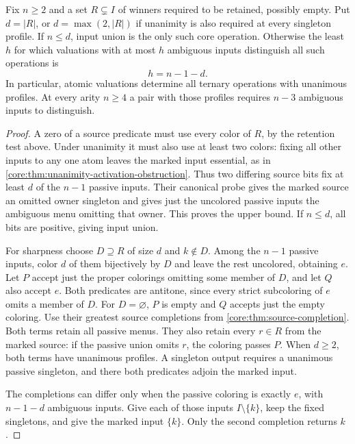 \begin{theorem}
\label{core:thm:sharp-ambiguity-probes}
Fix $n\geq2$ and a set $R\subsetneq I$ of winners required to be
retained, possibly empty. Put $d=|R|$, or $d=\max(2,|R|)$ if
unanimity is also required at every singleton profile.
If $n\leq d$, input union is the only such core operation. Otherwise
the least $h$ for which valuations with at most $h$ ambiguous inputs
distinguish all such operations is
\[
 h=n-1-d.
\]
In particular, atomic valuations determine all ternary operations
with unanimous profiles. At every arity $n\geq4$ a pair with those
profiles requires $n-3$ ambiguous inputs to distinguish.
\end{theorem}
\begin{proof}
A zero of a source predicate must use every color of $R$, by the
retention test above. Under unanimity it must also use at least two
colors: fixing all other inputs to any one atom leaves the marked
input essential, as in \cref{core:thm:unanimity-activation-obstruction}.
Thus two differing source bits fix at least $d$ of the $n-1$ passive
inputs. Their canonical probe gives the marked source an omitted
owner singleton and gives just the uncolored passive inputs the
ambiguous menu omitting that owner. This proves the upper bound.
If $n\leq d$, all bits are positive, giving input union.

For sharpness choose $D\supseteq R$ of size $d$ and $k\notin D$.
Among the $n-1$ passive inputs, color $d$ of them bijectively by $D$
and leave the rest uncolored, obtaining $e$. Let $P$ accept just the
proper colorings omitting some member of $D$, and let $Q$ also accept
$e$. Both predicates are antitone, since every strict subcoloring of
$e$ omits a member of $D$. For $D=\varnothing$, $P$ is empty and
$Q$ accepts just the empty coloring.
Use their greatest source completions from
\cref{core:thm:source-completion}. Both terms retain all passive
menus. They also retain every $r\in R$ from the marked source: if
the passive union omits $r$, the coloring passes $P$. When $d\geq2$,
both terms have unanimous profiles. A singleton output requires a
unanimous passive singleton, and there both predicates adjoin the
marked input.

The completions can differ only when the passive coloring is exactly
$e$, with $n-1-d$ ambiguous inputs. Give each of those inputs
$I\setminus\{k\}$, keep the fixed singletons, and give the marked
input $\{k\}$. Only the second completion returns $k$.
\end{proof}

